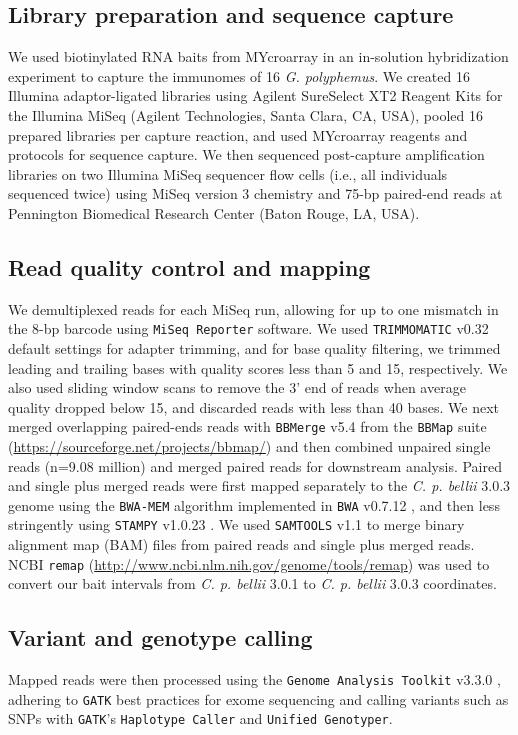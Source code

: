 \documentclass[english]{article}\usepackage[]{graphicx}\usepackage[]{color}
\begin{document}
\subsection*{Library preparation and sequence capture}
We used biotinylated RNA baits from MYcroarray in an in-solution hybridization experiment to capture the immunomes of 16 \textit{G. polyphemus}. We created 16 Illumina adaptor-ligated libraries using Agilent SureSelect XT2 Reagent Kits for the Illumina MiSeq (Agilent Technologies, Santa Clara, CA, USA), pooled 16 prepared libraries per capture reaction, and used MYcroarray reagents and protocols for sequence capture. We then sequenced post-capture amplification libraries on two Illumina MiSeq sequencer flow cells (i.e., all individuals sequenced twice) using MiSeq version 3 chemistry and 75-bp paired-end reads at Pennington Biomedical Research Center (Baton Rouge, LA, USA).

\subsection*{Read quality control and mapping}
We demultiplexed reads for each MiSeq run, allowing for up to one mismatch in the 8-bp barcode using \texttt{MiSeq Reporter} software. We used \texttt{TRIMMOMATIC} v0.32 \citep{Bolger_et_al_2014} default settings for adapter trimming, and for base quality filtering, we trimmed leading and trailing bases with quality scores less than 5 and 15, respectively. We also used sliding window scans to remove the 3' end of reads when average quality dropped below 15, and discarded reads with less than 40 bases. We next merged overlapping paired-ends reads with \texttt{BBMerge} v5.4 from the \texttt{BBMap} suite (\url{https://sourceforge.net/projects/bbmap/}) and then combined unpaired single reads (n=9.08 million) and merged paired reads for downstream analysis. Paired and single plus merged reads were first mapped separately to the \textit{C. p. bellii} 3.0.3 genome using the \texttt{BWA-MEM} algorithm \citep{Li_2013} implemented in \texttt{BWA} v0.7.12 \citep{Li_and_Durbin_2009}, and then less stringently using \texttt{STAMPY} v1.0.23 \citep{Lunter_and_Goodson_2011}. We used \texttt{SAMTOOLS} v1.1 \citep{Li_et_al_2009} to merge binary alignment map (BAM) files from paired reads and single plus merged reads. NCBI \texttt{remap} (\url{http://www.ncbi.nlm.nih.gov/genome/tools/remap}) was used to convert our bait intervals from \textit{C. p. bellii} 3.0.1 to \textit{C. p. bellii} 3.0.3 coordinates.

\subsection*{Variant and genotype calling}
Mapped reads were then processed using the \texttt{Genome Analysis Toolkit} v3.3.0 \citep[\texttt{GATK}]{McKenna_et_al_2010}, adhering to \texttt{GATK} best practices for exome sequencing and calling variants such as SNPs with \texttt{GATK}'s \texttt{Haplotype Caller} and \texttt{Unified Genotyper}.
\end{document}
